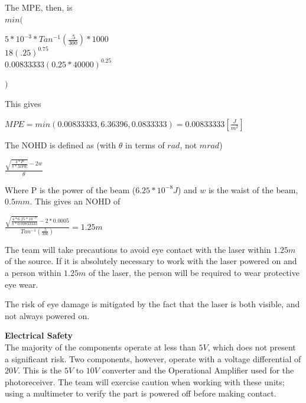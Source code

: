 \documentclass[letterpaper,10pt]{article}
\begin{document}
\begin{spacing}{1.15}
The MPE, then, is\\
{\large $min($}
\begin{center}
	\large
	$ 5*10^{-3} * Tan^{-1}(\frac{.5}{300})* 1000$\\
	$18 (.25)^{0.75}$ \\
	$0.00833333 (0.25*40000)^{0.25}$
\end{center}
{\large $)$}

This gives 
\begin{center}
	\large
	$MPE = min(0.00833333, 6.36396, 0.0833333) = 0.00833333 [\frac{J}{m^2}]$
\end{center}

The NOHD is defined as (with $\theta$ in terms of $rad$, not $mrad$)
\begin{center}
	\large
$ \frac{\sqrt{\frac{4 * P}{\pi * MPE}} - 2w}{\theta}$
\end{center}

Where P is the power of the beam ($6.25*10^{-8} J$) and $w$ is the waist of the beam, $0.5mm$. This gives an NOHD of 
\begin{center}
	\large
	$ \frac{\sqrt{\frac{4 * 6.25*10^{-8} }{\pi * 0.00833333}} - 2*0.0005}{Tan^{-1}(\frac{.5}{300})} = 1.25 m$
\end{center}

The team will take precautions to avoid eye contact with the laser within $1.25m$ of the source. If it is absolutely necessary to work with the laser powered on and a person within $1.25m$ of the laser, the person will be required to wear protective eye wear. 

The risk of eye damage is mitigated by the fact that the laser is both visible, and not always powered on. 

\normalsize\textbf{Electrical Safety} \\
The majority of the components operate at less than $5V$, which does not present a significant risk. Two components, however, operate with a voltage differential of $20V$. This is the $5V$ to $10V$ converter and the Operational Amplifier used for the photoreceiver. The team will exercise caution when working with these units; using a multimeter to verify the part is powered off before making contact. 



\end{spacing}
\end{document}
